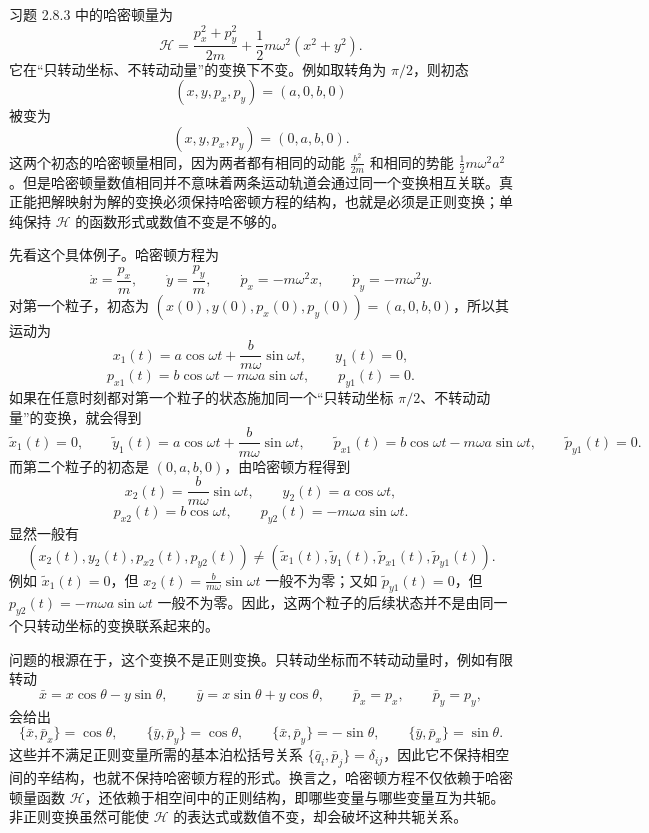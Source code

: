 \begin{solution}[非正则变换]
\answer
习题 2.8.3 中的哈密顿量为
\[
\mathcal H=\frac{p_x^2+p_y^2}{2m}+\frac{1}{2}m\omega^2(x^2+y^2).
\]
它在“只转动坐标、不转动动量”的变换下不变。例如取转角为 $\pi/2$，则初态
\[
(x,y,p_x,p_y)=(a,0,b,0)
\]
被变为
\[
(x,y,p_x,p_y)=(0,a,b,0).
\]
这两个初态的哈密顿量相同，因为两者都有相同的动能 $\frac{b^2}{2m}$ 和相同的势能 $\frac{1}{2}m\omega^2a^2$。但是哈密顿量数值相同并不意味着两条运动轨道会通过同一个变换相互关联。真正能把解映射为解的变换必须保持哈密顿方程的结构，也就是必须是正则变换；单纯保持 $\mathcal H$ 的函数形式或数值不变是不够的。

先看这个具体例子。哈密顿方程为
\[
\dot x=\frac{p_x}{m},\qquad \dot y=\frac{p_y}{m},\qquad \dot p_x=-m\omega^2x,\qquad \dot p_y=-m\omega^2y.
\]
对第一个粒子，初态为 $(x(0),y(0),p_x(0),p_y(0))=(a,0,b,0)$，所以其运动为
\[
x_1(t)=a\cos\omega t+\frac{b}{m\omega}\sin\omega t,\qquad y_1(t)=0,
\]
\[
p_{x1}(t)=b\cos\omega t-m\omega a\sin\omega t,\qquad p_{y1}(t)=0.
\]
如果在任意时刻都对第一个粒子的状态施加同一个“只转动坐标 $\pi/2$、不转动动量”的变换，就会得到
\[
\widetilde x_1(t)=0,\qquad \widetilde y_1(t)=a\cos\omega t+\frac{b}{m\omega}\sin\omega t,\qquad \widetilde p_{x1}(t)=b\cos\omega t-m\omega a\sin\omega t,\qquad \widetilde p_{y1}(t)=0.
\]
而第二个粒子的初态是 $(0,a,b,0)$，由哈密顿方程得到
\[
x_2(t)=\frac{b}{m\omega}\sin\omega t,\qquad y_2(t)=a\cos\omega t,
\]
\[
p_{x2}(t)=b\cos\omega t,\qquad p_{y2}(t)=-m\omega a\sin\omega t.
\]
显然一般有
\[
(x_2(t),y_2(t),p_{x2}(t),p_{y2}(t))\neq(\widetilde x_1(t),\widetilde y_1(t),\widetilde p_{x1}(t),\widetilde p_{y1}(t)).
\]
例如 $\widetilde x_1(t)=0$，但 $x_2(t)=\frac{b}{m\omega}\sin\omega t$ 一般不为零；又如 $\widetilde p_{y1}(t)=0$，但 $p_{y2}(t)=-m\omega a\sin\omega t$ 一般不为零。因此，这两个粒子的后续状态并不是由同一个只转动坐标的变换联系起来的。

问题的根源在于，这个变换不是正则变换。只转动坐标而不转动动量时，例如有限转动
\[
\bar x=x\cos\theta-y\sin\theta,\qquad \bar y=x\sin\theta+y\cos\theta,\qquad \bar p_x=p_x,\qquad \bar p_y=p_y,
\]
会给出
\[
\{\bar x,\bar p_x\}=\cos\theta,\qquad \{\bar y,\bar p_y\}=\cos\theta,\qquad \{\bar x,\bar p_y\}=-\sin\theta,\qquad \{\bar y,\bar p_x\}=\sin\theta.
\]
这些并不满足正则变量所需的基本泊松括号关系 $\{\bar q_i,\bar p_j\}=\delta_{ij}$，因此它不保持相空间的辛结构，也就不保持哈密顿方程的形式。换言之，哈密顿方程不仅依赖于哈密顿量函数 $\mathcal H$，还依赖于相空间中的正则结构，即哪些变量与哪些变量互为共轭。非正则变换虽然可能使 $\mathcal H$ 的表达式或数值不变，却会破坏这种共轭关系。


\end{solution}
